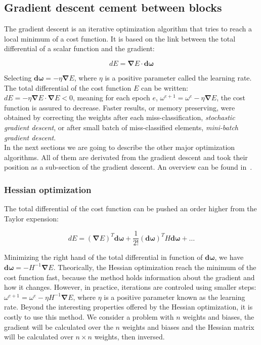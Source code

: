\documentclass[final, paper=letter,5p,times,twocolumn]{elsarticle}
\begin{document}
\subsection{Gradient descent cement between blocks}
The gradient descent is an iterative optimization algorithm that tries to reach a local minimum of a cost function. It is based on the link between the total differential of a scalar function and the gradient:

$$
dE = \bm{\nabla}E \cdot \bm{d \omega}
$$

Selecting $\bm{d\omega} = -\eta \bm{\nabla}E$, where $\eta$ is a positive parameter called the learning rate. The total differential of the cost function $E$ can be written: $dE = -\eta \bm{\nabla}E \cdot \bm{\nabla}E < 0$, meaning for each epoch $e$, $\omega^{e+1} = \omega^{e} - \eta \bm{\nabla} E$, the cost function is assured to decrease. 
Faster results, or memory preserving, were obtained by correcting the weights after each miss-classification, {\it stochastic gradient descent}, or after small batch of miss-classified elements, {\it mini-batch gradient descent}. \\
In the next sections we are going to describe the other major optimization algorithms. All of them are derivated from the gradient descent and took their position as a sub-section of the gradient descent. An overview can be found in~\cite{DBLP:Ruder16}.

\subsubsection{Hessian optimization}

The total differential of the cost function can be pushed an order higher from the Taylor expension:

$$
dE = (\bm{\nabla}E)^{T} \bm{d \omega} + \frac{1}{2!}(\bm{d \omega})^{T}H\bm{d \omega} + \dots
$$

Minimizing the right hand of the total differential in function of $\bm{d \omega}$, we have $\bm{d \omega} = - H^{-1} \bm{\nabla}E$. Theorically, the Hessian optimization reach the minimum of the cost function fast, because the method holds information about the gradient and how it changes. However, in practice, iterations are controled using smaller steps: $\omega^{e+1} = \omega^{e} - \eta  H^{-1} \bm{\nabla}E$, where $\eta$ is a positive parameter known as the learning rate. Beyond the interesting properties offered by the Hessian optimization, it is costly to use this method. We consider a problem with $n$ weights and biases, the gradient will be calculated over the $n$ weights and biases and the Hessian matrix will be calculated over $n \times n$ weights, then inversed.
\end{document}
